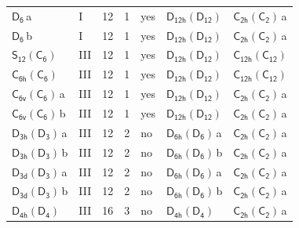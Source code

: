 \documentclass[10pt,a4paper]{article}
\numberwithin{equation}{section}
\newcommand{\grp}[1]{\mathsf{#1}}
\newcommand{\clsletter}[1]{\,{\scriptsize\color{black!55}#1}}
\begin{document}
{\begin{longtable}{@{}llrrlll@{}}
\href{../../../rotation/data/pdf/D6.pdf}{$\grp{D_{6}}$}\clsletter{a} & I & 12 & 1 & yes & \href{D12h-D12.pdf}{$\grp{D_{12h}}(\grp{D_{12}})$} & \href{C2h-C2.pdf}{$\grp{C_{2h}}(\grp{C_{2}})$}\clsletter{a}\\
\href{../../../rotation/data/pdf/D6.pdf}{$\grp{D_{6}}$}\clsletter{b} & I & 12 & 1 & yes & \href{D12h-D12.pdf}{$\grp{D_{12h}}(\grp{D_{12}})$} & \href{C2h-C2.pdf}{$\grp{C_{2h}}(\grp{C_{2}})$}\clsletter{a}\\
\href{S12-C6.pdf}{$\grp{S_{12}}(\grp{C_{6}})$} & III & 12 & 1 & yes & \href{D12h-D12.pdf}{$\grp{D_{12h}}(\grp{D_{12}})$} & \href{C12h-C12.pdf}{$\grp{C_{12h}}(\grp{C_{12}})$}\\
\href{C6h-C6.pdf}{$\grp{C_{6h}}(\grp{C_{6}})$} & III & 12 & 1 & yes & \href{D12h-D12.pdf}{$\grp{D_{12h}}(\grp{D_{12}})$} & \href{C12h-C12.pdf}{$\grp{C_{12h}}(\grp{C_{12}})$}\\
\href{C6v-C6.pdf}{$\grp{C_{6v}}(\grp{C_{6}})$}\clsletter{a} & III & 12 & 1 & yes & \href{D12h-D12.pdf}{$\grp{D_{12h}}(\grp{D_{12}})$} & \href{C2h-C2.pdf}{$\grp{C_{2h}}(\grp{C_{2}})$}\clsletter{a}\\
\href{C6v-C6.pdf}{$\grp{C_{6v}}(\grp{C_{6}})$}\clsletter{b} & III & 12 & 1 & yes & \href{D12h-D12.pdf}{$\grp{D_{12h}}(\grp{D_{12}})$} & \href{C2h-C2.pdf}{$\grp{C_{2h}}(\grp{C_{2}})$}\clsletter{a}\\
\href{D3h-D3.pdf}{$\grp{D_{3h}}(\grp{D_{3}})$}\clsletter{a} & III & 12 & 2 & no & \href{D6h-D6.pdf}{$\grp{D_{6h}}(\grp{D_{6}})$}\clsletter{a} & \href{C2h-C2.pdf}{$\grp{C_{2h}}(\grp{C_{2}})$}\clsletter{a}\\
\href{D3h-D3.pdf}{$\grp{D_{3h}}(\grp{D_{3}})$}\clsletter{b} & III & 12 & 2 & no & \href{D6h-D6.pdf}{$\grp{D_{6h}}(\grp{D_{6}})$}\clsletter{b} & \href{C2h-C2.pdf}{$\grp{C_{2h}}(\grp{C_{2}})$}\clsletter{a}\\
\href{D3d-D3.pdf}{$\grp{D_{3d}}(\grp{D_{3}})$}\clsletter{a} & III & 12 & 2 & no & \href{D6h-D6.pdf}{$\grp{D_{6h}}(\grp{D_{6}})$}\clsletter{a} & \href{C2h-C2.pdf}{$\grp{C_{2h}}(\grp{C_{2}})$}\clsletter{a}\\
\href{D3d-D3.pdf}{$\grp{D_{3d}}(\grp{D_{3}})$}\clsletter{b} & III & 12 & 2 & no & \href{D6h-D6.pdf}{$\grp{D_{6h}}(\grp{D_{6}})$}\clsletter{b} & \href{C2h-C2.pdf}{$\grp{C_{2h}}(\grp{C_{2}})$}\clsletter{a}\\
\href{D4h-D4.pdf}{$\grp{D_{4h}}(\grp{D_{4}})$} & III & 16 & 3 & no & \href{D4h-D4.pdf}{$\grp{D_{4h}}(\grp{D_{4}})$} & \href{C2h-C2.pdf}{$\grp{C_{2h}}(\grp{C_{2}})$}\clsletter{a}\\

\end{longtable}}
\end{document}
